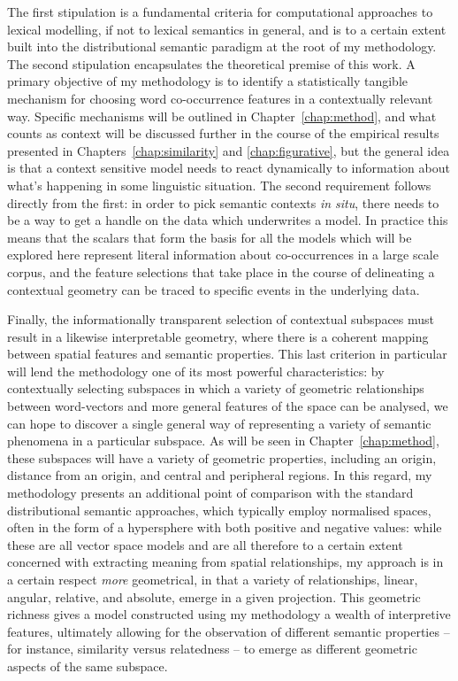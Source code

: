 The first stipulation is a fundamental criteria for computational approaches to lexical modelling, if not to lexical semantics in general, and is to a certain extent built into the distributional semantic paradigm at the root of my methodology.  The second stipulation encapsulates the theoretical premise of this work.  A primary objective of my methodology is to identify a statistically tangible mechanism for choosing word co-occurrence features in a contextually relevant way.  Specific mechanisms will be outlined in Chapter~\ref{chap:method}, and what counts as context will be discussed further in the course of the empirical results presented in Chapters~\ref{chap:similarity} and \ref{chap:figurative}, but the general idea is that a context sensitive model needs to react dynamically to information about what's happening in some linguistic situation.  The second requirement follows directly from the first: in order to pick semantic contexts \emph{in situ}, there needs to be a way to get a handle on the data which underwrites a model.  In practice this means that the scalars that form the basis for all the models which will be explored here represent literal information about co-occurrences in a large scale corpus, and the feature selections that take place in the course of delineating a contextual geometry can be traced to specific events in the underlying data.

Finally, the informationally transparent selection of contextual subspaces must result in a likewise interpretable geometry, where there is a coherent mapping between spatial features and semantic properties.  This last criterion in particular will lend the methodology one of its most powerful characteristics: by contextually selecting subspaces in which a variety of geometric relationships between word-vectors and more general features of the space can be analysed, we can hope to discover a single general way of representing a variety of semantic phenomena in a particular subspace.  As will be seen in Chapter~\ref{chap:method}, these subspaces will have a variety of geometric properties, including an origin, distance from an origin, and central and peripheral regions.  In this regard, my methodology presents an additional point of comparison with the standard distributional semantic approaches, which typically employ normalised spaces, often in the form of a hypersphere with both positive and negative values: while these are all vector space models and are all therefore to a certain extent concerned with extracting meaning from spatial relationships, my approach is in a certain respect \emph{more} geometrical, in that a variety of relationships, linear, angular, relative, and absolute, emerge in a given projection.  This geometric richness gives a model constructed using my methodology a wealth of interpretive features, ultimately allowing for the observation of different semantic properties -- for instance, similarity versus relatedness -- to emerge as different geometric aspects of the same subspace.

